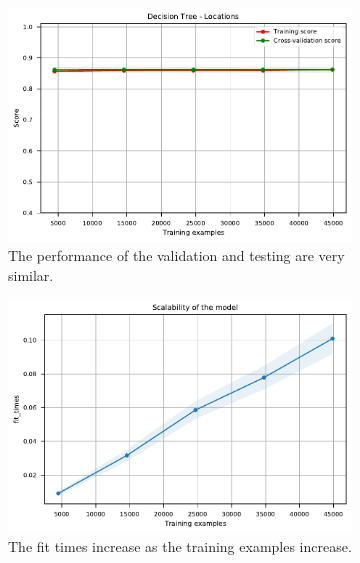 \documentclass{l4proj}
\begin{document}
\begin{appendices}
\begin{figure}[htbp]
    \centering
    \begin{subfigure}[b]{0.70\textwidth}
        \includegraphics[width=\textwidth]{images/location/learning_curve_1_DecisionTreeLocations.pdf}
        \caption{The performance of the validation and testing are very similar.}
        \label{fig:learning_curve_1_DecisionTreeLocations}
    \end{subfigure}
    \begin{subfigure}[b]{0.70\textwidth}
        \includegraphics[width=\textwidth]{images/location/learning_curve_2_DecisionTreeLocations.pdf}
        \caption{The fit times increase as the training examples increase.}
        \label{fig:learning_curve_2_DecisionTreeLocations}
    \end{subfigure}
    \begin{subfigure}[b]{0.70\textwidth}

\end{subfigure}
\end{figure}
\end{appendices}
\end{document}
